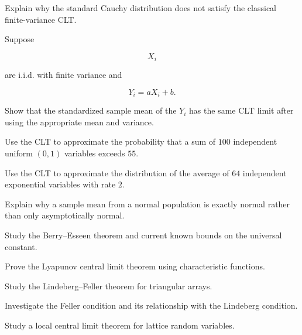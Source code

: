 \begin{exercise}[3]
Explain why the standard Cauchy distribution does not satisfy the
classical finite-variance CLT.
\end{exercise}

\begin{exercise}[3]
Suppose

\[
X_i
\]

are i.i.d. with finite variance and

\[
Y_i=aX_i+b.
\]

Show that the standardized sample mean of the \(Y_i\) has the same CLT
limit after using the appropriate mean and variance.
\end{exercise}

\begin{exercise}[3]
Use the CLT to approximate the probability that a sum of \(100\)
independent uniform \((0,1)\) variables exceeds \(55\).
\end{exercise}

\begin{exercise}[3]
Use the CLT to approximate the distribution of the average of \(64\)
independent exponential variables with rate \(2\).
\end{exercise}

\begin{exercise}[3]
Explain why a sample mean from a normal population is exactly normal
rather than only asymptotically normal.
\end{exercise}

\begin{exercise}[4]
Study the Berry--Esseen theorem and current known bounds on the universal
constant.
\end{exercise}

\begin{exercise}[4]
Prove the Lyapunov central limit theorem using characteristic functions.
\end{exercise}

\begin{exercise}[4]
Study the Lindeberg--Feller theorem for triangular arrays.
\end{exercise}

\begin{exercise}[4]
Investigate the Feller condition and its relationship with the
Lindeberg condition.
\end{exercise}

\begin{exercise}[4]
Study a local central limit theorem for lattice random variables.
\end{exercise}

